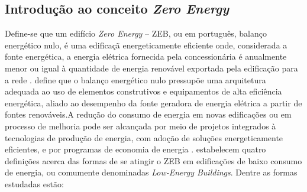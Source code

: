 \subsection{Introdução ao conceito \textit{Zero Energy}}
Define-se que um edifício \textit{Zero Energy} – ZEB, ou em português, balanço energético nulo, é uma edificaçã energeticamente eficiente onde, considerada a fonte energética, a energia elétrica fornecida pela concessionária é anualmente menor ou igual à quantidade de energia renovável exportada pela edificação para a rede \cite{Torcellini2006,U.S.DepartmentofEnergy-USDOE2012,U.S.DepartmentofEnergy-USDOE2015}.\vspace*{0.3cm} \newline
\textcite{Domingos2014} define que o balanço energético nulo pressupõe uma arquitetura adequada ao uso de elementos construtivos e equipamentos de alta eficiência energética, aliado ao desempenho da fonte geradora de energia elétrica a partir de fontes renováveis.\newline A redução do consumo de energia em novas edificações ou em processo de melhoria pode ser alcançada por meio de projetos integrados à tecnologias de produção de energia, com adoção de soluções energeticamente eficientes, e por programas de economia de energia \cite{U.S.DepartmentofEnergy-USDOE2015}.\vspace*{0.3cm} \newline
\textcite{Torcellini2006} estabelecem quatro definições acerca das formas de se atingir o ZEB em edificações de baixo consumo de energia, ou comumente denominadas \textit{Low-Energy Buildings}. Dentre as formas estudadas estão:

